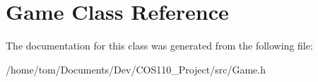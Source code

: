 \hypertarget{classGame}{\section{Game Class Reference}
\label{classGame}
}


The documentation for this class was generated from the following file\-:\begin{DoxyCompactItemize}
\item 
/home/tom/\-Documents/\-Dev/\-C\-O\-S110\-\_\-\-Project/src/Game.\-h\end{DoxyCompactItemize}
